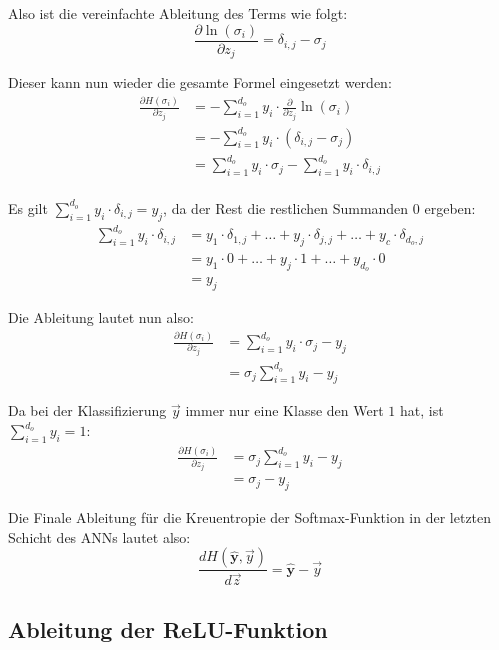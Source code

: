 \documentclass[12pt,titlepage]{article}
\begin{document}
Also ist die vereinfachte Ableitung des Terms wie folgt:
\[
  \frac{\partial \ln(\sigma_i)}{\partial z_j} = \delta_{i,j} - \sigma_j
\]

Dieser kann nun wieder die gesamte Formel eingesetzt werden:
\[
  \begin{aligned}
    \frac{\partial H(\sigma_i) }{\partial z_j}
     & = - \sum_{i=1}^{d_o} y_i \cdot \frac{\partial}{\partial z_j} \ln(\sigma_i)     \\
     & = - \sum_{i=1}^{d_o} y_i \cdot ( \delta_{i,j} - \sigma_j )                     \\
     & = \sum_{i=1}^{d_o} y_i \cdot \sigma_j -\sum_{i=1}^{d_o} y_i \cdot \delta_{i,j} \\
  \end{aligned}
\]

Es gilt $\sum_{i=1}^{d_o} y_i \cdot \delta_{i,j} = y_j$, da der Rest die restlichen Summanden $0$ ergeben:
\[
  \begin{aligned}
    \sum_{i=1}^{d_o} y_i \cdot \delta_{i,j}
     & = y_1 \cdot \delta_{1,j} + \dots + y_j \cdot \delta_{j,j} + \dots + y_c \cdot \delta_{d_o,j} \\
     & = y_1 \cdot 0 + \dots + y_j \cdot 1 + \dots + y_{d_o} \cdot 0                                \\
     & = y_j
  \end{aligned}
\]

Die Ableitung lautet nun also:
\[
  \begin{aligned}
    \frac{\partial H(\sigma_i) }{\partial z_j}
     & = \sum_{i=1}^{d_o} y_i \cdot \sigma_j - y_j \\
     & = \sigma_j \sum_{i=1}^{d_o} y_i - y_j
  \end{aligned}
\]

Da bei der Klassifizierung $\vec{y}$ immer nur eine Klasse den Wert $1$ hat, ist $\sum_{i=1}^{d_o} y_i = 1$:
\[
  \begin{aligned}
    \frac{\partial H(\sigma_i) }{\partial z_j}
     & = \sigma_j \sum_{i=1}^{d_o} y_i - y_j \\
     & = \sigma_j - y_j
  \end{aligned}
\]

Die Finale Ableitung für die Kreuentropie der Softmax-Funktion in der letzten Schicht des ANNs lautet also:
\[
  \frac{dH(\mathbf{\hat{y}}, \vec{y}) }{d\vec{z}} = \mathbf{\hat{y}} - \vec{y}
\]

\newpage

\subsection{Ableitung der ReLU-Funktion}
\end{document}
